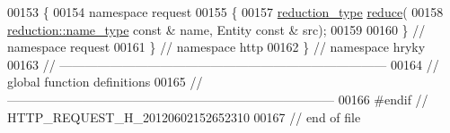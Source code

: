 \begin{DoxyCode}
00153 \{
00154 \textcolor{keyword}{namespace }request
00155 \{
00157     \hyperlink{namespacehryky_a343a9a4c36a586be5c2693156200eadc}{reduction_type} \hyperlink{namespacehryky_1_1http_a08fc36a78a8e2908140fcd102829a566}{reduce}(
00158         \hyperlink{namespacehryky_1_1reduction_ac686c30a4c8d196bbd0f05629a6b921f}{reduction::name_type} \textcolor{keyword}{const} & name, Entity \textcolor{keyword}{const} & src);
00159 
00160 \} \textcolor{comment}{// namespace request}
00161 \} \textcolor{comment}{// namespace http}
00162 \} \textcolor{comment}{// namespace hryky}
00163 \textcolor{comment}{//
      ------------------------------------------------------------------------------}
00164 \textcolor{comment}{// global function definitions}
00165 \textcolor{comment}{//
      ------------------------------------------------------------------------------}
00166 \textcolor{preprocessor}{#endif // HTTP\_REQUEST\_H\_20120602152652310}
00167 \textcolor{preprocessor}{}\textcolor{comment}{// end of file}
\end{DoxyCode}
